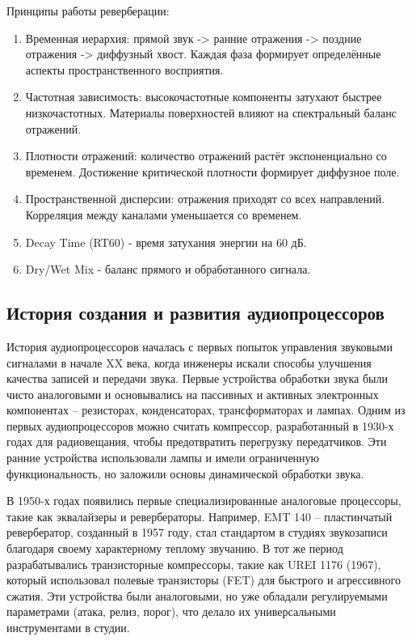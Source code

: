 Принципы работы реверберации:
\begin{enumerate}
	\item Временная иерархия: прямой звук -> ранние отражения -> поздние отражения -> диффузный хвост. Каждая фаза формирует определённые аспекты пространственного восприятия.
	\item Частотная зависимость: высокочастотные компоненты затухают быстрее низкочастотных. Материалы поверхностей влияют на спектральный баланс отражений.
	\item Плотности отражений: количество отражений растёт экспоненциально со временем. Достижение критической плотности формирует диффузное поле.
	\item Пространственной дисперсии: отражения приходят со всех направлений. Корреляция между каналами уменьшается со временем.
	\item Decay Time (RT60) - время затухания энергии на 60 дБ.
	\item Dry/Wet Mix - баланс прямого и обработанного сигнала.
\end{enumerate}

\subsection{История создания и развития аудиопроцессоров}
История аудиопроцессоров началась с первых попыток управления звуковыми сигналами в начале XX века, когда инженеры искали способы улучшения качества записей и передачи звука. Первые устройства обработки звука были чисто аналоговыми и основывались на пассивных и активных электронных компонентах – резисторах, конденсаторах, трансформаторах и лампах. Одним из первых аудиопроцессоров можно считать компрессор, разработанный в 1930-х годах для радиовещания, чтобы предотвратить перегрузку передатчиков. Эти ранние устройства использовали лампы и имели ограниченную функциональность, но заложили основы динамической обработки звука.

В 1950-х годах появились первые специализированные аналоговые процессоры, такие как эквалайзеры и ревербераторы. Например, EMT 140 – пластинчатый ревербератор, созданный в 1957 году, стал стандартом в студиях звукозаписи благодаря своему характерному теплому звучанию. В тот же период разрабатывались транзисторные компрессоры, такие как UREI 1176 (1967), который использовал полевые транзисторы (FET) для быстрого и агрессивного сжатия. Эти устройства были аналоговыми, но уже обладали регулируемыми параметрами (атака, релиз, порог), что делало их универсальными инструментами в студии.

